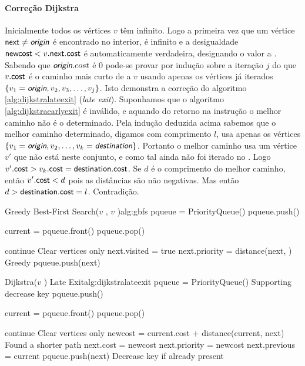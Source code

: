 \documentclass[relatorio.tex]{subfiles}
\begin{document}
\paragraph{Correção Dijkstra}
Inicialmente todos os vértices $v$ têm  infinito. Logo a primeira vez
que um vértice $\sfmath{next}\neq\var{origin}$ é encontrado no  interior,
 é infinito e a desigualdade $\sfmath{newcost}<v.\sfmath{next.cost}$ é
automaticamente verdadeira, designando o valor  a .
Sabendo que $\textsl{\textsf{origin}}.cost$ é $0$ pode-se provar por indução sobre a iteração
$j$ do  que $v.\sfmath{cost}$ é o caminho mais curto de  a
$v$ usando apenas os vértices já iterados $\{v_1=\textsl{\textsf{origin}},v_2,v_3,\dots,v_j\}$.
Isto demonstra a correção do algoritmo \ref{alg:dijkstralateexit} (\emph{late exit}).
Suponhamos que o algoritmo \ref{alg:dijkstraearlyexit} é inválido, e aquando do retorno
na instrução  o melhor caminho não é o determinado. Pela indução deduzida acima
sabemos que o melhor caminho determinado, digamos com comprimento $l$, usa apenas os vértices
$\{v_1=\textsl{\textsf{origin}},v_2,\dots,v_k=\textsl{\textsf{destination}}\}$. Portanto o melhor caminho
usa um vértice $v'$ que não está neste conjunto, e como tal ainda não foi iterado
no . Logo $v'.\sfmath{cost}>v_k.\sfmath{cost}=\sfmath{destination.cost}$.
Se $d$ é o comprimento do melhor caminho, então $v'.\sfmath{cost}<d$ pois as distâncias
são não negativas. Mas então $d>\sfmath{destination.cost}=l$. Contradição.

\begin{algor}{Greedy Best-First Search($v$ , $v$ )}{alg:gbfs}
\State pqueue = PriorityQueue()
\State pqueue.push()

    \State current = pqueue.front()
    \State pqueue.pop()

            \State continue \Comment Clear vertices only
        \EndIf
            \State next.visited = true
            \State next.priority = distance(next, ) \Comment Greedy
            \State pqueue.push(next)
        \EndIf
    \EndFor
\EndWhile
\end{algor}

\begin{algor}{Dijkstra($v$ ) \Comment Late Exit}{alg:dijkstralateexit}
\State pqueue = PriorityQueue() \Comment Supporting decrease key
\State pqueue.push()

    \State current = pqueue.front()
    \State pqueue.pop()

            \State continue \Comment Clear vertices only
        \EndIf
        \State newcost = current.cost + distance(current, next)
         \Comment Found a shorter path
            \State next.cost = newcost
            \State next.priority = newcost
            \State next.previous = current
            \State pqueue.push(next) \Comment Decrease key if already present
        \EndIf
    \EndFor
\EndWhile
\end{algor}
\end{document}
